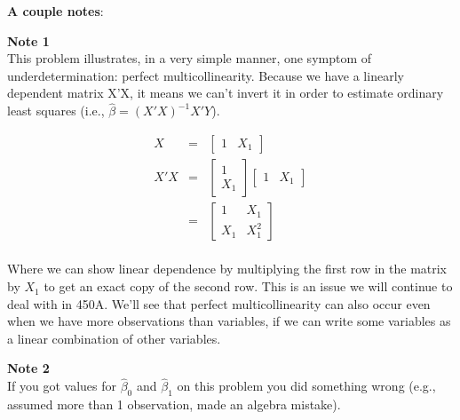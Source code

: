 \documentclass[10pt]{amsart}
\begin{document}
 \textbf{A couple notes}:
 
 \textbf{Note 1}\\
This problem illustrates, in a very simple manner, one symptom of underdetermination: perfect multicollinearity. Because we have a linearly dependent matrix X'X, it means we can't invert it in order to estimate ordinary least squares (i.e., $ \hat \beta = (X'X)^{-1}X'Y$). 
 
 \begin{eqnarray*}
X &=& \begin{bmatrix} 1 & X_1 \end{bmatrix}\\
X'X &=& \begin{bmatrix} 1 \\
					X_1 \end{bmatrix} \begin{bmatrix} 1 & X_1 \end{bmatrix}\\
	&=& \begin{bmatrix} 1 & X_1 \\
		X_1 & X_1^2 \end{bmatrix}
\end{eqnarray*}
\\
Where we can show linear dependence by multiplying the first row in the matrix by $X_1$ to get an exact copy of the second row. This is an issue we will continue to deal with in 450A. We'll see that perfect multicollinearity can also occur even when we have more observations than variables, if we can write some variables as a linear combination of other variables. 

\textbf{Note 2}\\
If you got values for $\hat \beta_0$ and $\hat \beta_1$ on this problem you did something wrong (e.g., assumed more than 1 observation, made an algebra mistake).  

\end{document}
